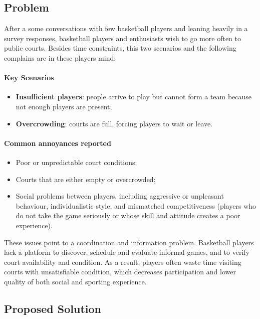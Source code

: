 \subsection{Problem}\label{subsec:problem}

After a some conversations with few basketball players and leaning heavily in a survey responses, basketball players and enthusiasts wish to go more often to public courts.
Besides time constraints, this two scenarios and the following complains are in these players mind:

\paragraph{Key Scenarios}
\begin{itemize}
    \item \textbf{Insufficient players}: people arrive to play but cannot form a team because not enough players are present;
    \item \textbf{Overcrowding}: courts are full, forcing players to wait or leave.
\end{itemize}

\paragraph{Common annoyances reported}
\begin{itemize}
    \item Poor or unpredictable court conditions;
    \item Courts that are either empty or overcrowded;
    \item Social problems between players, including aggressive or unpleasant behaviour, individualistic style, and mismatched competitiveness (players who do not take the game seriously or whose skill and attitude creates a poor experience).
\end{itemize}

These issues point to a coordination and information problem.
Basketball players lack a platform to discover, schedule and evaluate informal games, and to verify court availability and condition.
As a result, players often waste time visiting courts with unsatisfiable condition, which decreases participation and lower quality of both social and sporting experience.

\subsection{Proposed Solution}\label{subsec:proposed-solution}

